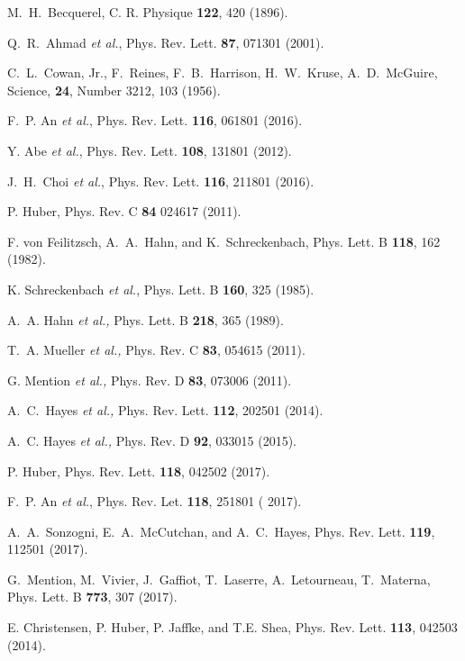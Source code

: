 \documentclass[twocolumn,amsmath,amssymb,10pt,superscriptaddress,a4paper,letterpaper,fleqn]{revtex4-1}
\begin{document}
\begin{thebibliography}{10}

 M.~H.~Becquerel, C. R. Physique {\bf 122}, 420 (1896).

 Q.~R.~Ahmad {\it et al.}, Phys. Rev. Lett. {\bf 87}, 071301 (2001).

 C.~L.~Cowan, Jr., F.~Reines, F.~B.~Harrison, H.~W.~Kruse, A.~D.~McGuire, Science, {\bf 24}, Number 3212, 103  (1956). 
 
 F.~P. An  {\it et al.}, Phys. Rev. Lett. {\bf 116},  061801 (2016).

 Y. Abe {\it et al.},  Phys. Rev. Lett. {\bf 108}, 131801 (2012).  

 J.~H.~Choi {\it et al.}, Phys. Rev. Lett. {\bf 116}, 211801 (2016).

 P. Huber,  Phys. Rev. C {\bf 84} 024617 (2011).

 F. von Feilitzsch, A.~A.~Hahn, and K.~Schreckenbach, Phys. Lett. B {\bf 118}, 162 (1982).

 K. Schreckenbach {\it et al.}, Phys. Lett. B {\bf 160}, 325 (1985).

 A.~A. Hahn {\it et al.,} Phys. Lett. B {\bf 218}, 365 (1989).
 
 T.~A. Mueller {\it et al.,} Phys. Rev. C {\bf 83}, 054615 (2011). 

 G. Mention {\it et al.,}  Phys. Rev. D {\bf 83}, 073006 (2011). 

 A.~C.~Hayes {\it et al.,} Phys. Rev. Lett. {\bf 112}, 202501 (2014).

 A.~C. Hayes {\it et al.,} Phys. Rev. D {\bf 92}, 033015 (2015).

 P. Huber, Phys. Rev. Lett. {\bf 118}, 042502 (2017).

 F.~P. An  {\it et al.}, Phys. Rev. Let. {\bf 118}, 251801 ( 2017).

 A.~A.~Sonzogni, E.~A.~McCutchan, and A.~C.~Hayes, Phys. Rev. Lett.  {\bf 119}, 112501 (2017).

 G.~Mention, M.~Vivier, J.~Gaffiot, T.~Laserre, A.~Letourneau, T.~Materna, Phys. Lett. B {\bf 773}, 307 (2017).

  E. Christensen, P. Huber, P. Jaffke, and T.E. Shea, Phys. Rev. Lett. {\bf 113}, 042503 (2014).


\end{thebibliography}
\end{document}
